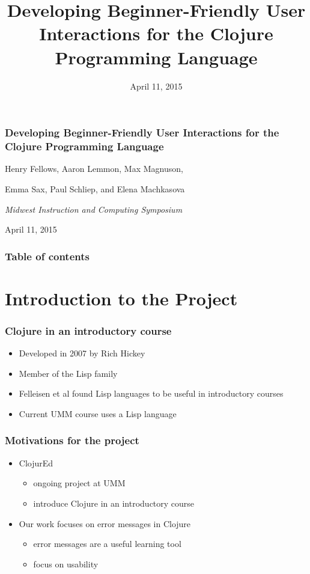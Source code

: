 \documentclass{beamer}
\begin{document}
\title{Developing Beginner-Friendly User Interactions for the Clojure Programming Language}
\date{April 11, 2015}

\begin{frame}
\frametitle{Developing Beginner-Friendly User Interactions for the Clojure Programming Language}
{\centering
\noindent
Henry Fellows, Aaron Lemmon, Max Magnuson, \par
Emma Sax, Paul Schliep, and Elena Machkasova \par

{\it 
Midwest Instruction and Computing Symposium\par
April 11, 2015\par}
}
\end{frame}

\begin{frame}
\frametitle{Table of contents}
\tableofcontents  
\end{frame}

\section{Introduction to the Project}
\begin{frame}
	\frametitle{Clojure in an introductory course}
	\begin{itemize}
		\item Developed in 2007 by Rich Hickey
		\item Member of the Lisp family
		\item Felleisen et al found Lisp languages to be useful in introductory courses
		\item Current UMM course uses a Lisp language
	\end{itemize}
\end{frame}

\begin{frame}
\frametitle{Motivations for the project}
	\begin{itemize}
		\item ClojurEd
			\begin{itemize}
				\item ongoing project at UMM
				\item introduce Clojure in an introductory course
			\end{itemize}
		\item Our work focuses on error messages in Clojure
			\begin{itemize}
				\item error messages are a useful learning tool
				\item focus on usability
			\end{itemize}
	\end{itemize}
\end{frame}
\end{document}
